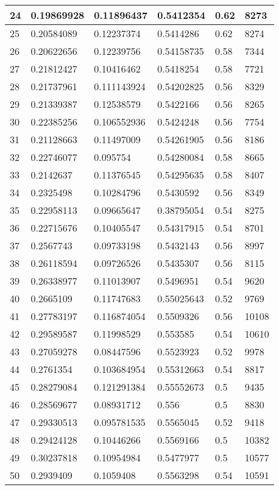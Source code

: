 \begin{longtable}{|l|l|l|l|l|l|}
24 & 0.19869928 & 0.11896437 & 0.5412354 & 0.62 & 8273 \\ \hline 
25 & 0.20584089 & 0.12237374 & 0.5414286 & 0.62 & 8274 \\ \hline 
26 & 0.20622656 & 0.12239756 & 0.54158735 & 0.58 & 7344 \\ \hline 
27 & 0.21812427 & 0.10416462 & 0.5418254 & 0.58 & 7721 \\ \hline 
28 & 0.21737961 & 0.111143924 & 0.54202825 & 0.56 & 8329 \\ \hline 
29 & 0.21339387 & 0.12538579 & 0.5422166 & 0.56 & 8265 \\ \hline 
30 & 0.22385256 & 0.106552936 & 0.5424248 & 0.56 & 7754 \\ \hline 
31 & 0.21128663 & 0.11497009 & 0.54261905 & 0.56 & 8186 \\ \hline 
32 & 0.22746077 & 0.095754 & 0.54280084 & 0.58 & 8665 \\ \hline 
33 & 0.2142637 & 0.11376545 & 0.54295635 & 0.58 & 8407 \\ \hline 
34 & 0.2325498 & 0.10284796 & 0.5430592 & 0.56 & 8349 \\ \hline 
35 & 0.22958113 & 0.09665647 & 0.38795054 & 0.54 & 8275 \\ \hline 
36 & 0.22715676 & 0.10405547 & 0.54317915 & 0.54 & 8701 \\ \hline 
37 & 0.2567743 & 0.09733198 & 0.5432143 & 0.56 & 8997 \\ \hline 
38 & 0.26118594 & 0.09726526 & 0.5435307 & 0.56 & 8115 \\ \hline 
39 & 0.26338977 & 0.11013907 & 0.5496951 & 0.54 & 9620 \\ \hline 
40 & 0.2665109 & 0.11747683 & 0.55025643 & 0.52 & 9769 \\ \hline 
41 & 0.27783197 & 0.116874054 & 0.5509326 & 0.56 & 10108 \\ \hline 
42 & 0.29589587 & 0.11998529 & 0.553585 & 0.54 & 10610 \\ \hline 
43 & 0.27059278 & 0.08447596 & 0.5523923 & 0.52 & 9978 \\ \hline 
44 & 0.2761354 & 0.103684954 & 0.55312663 & 0.54 & 8817 \\ \hline 
45 & 0.28279084 & 0.121291384 & 0.55552673 & 0.5 & 9435 \\ \hline 
46 & 0.28569677 & 0.08931712 & 0.556 & 0.5 & 8830 \\ \hline 
47 & 0.29330513 & 0.095781535 & 0.5565045 & 0.52 & 9418 \\ \hline 
48 & 0.29424128 & 0.10446266 & 0.5569166 & 0.5 & 10382 \\ \hline 
49 & 0.30237818 & 0.10954984 & 0.5477977 & 0.5 & 10577 \\ \hline 
50 & 0.2939409 & 0.1059408 & 0.5563298 & 0.54 & 10591 \\ \hline 
\end{longtable}